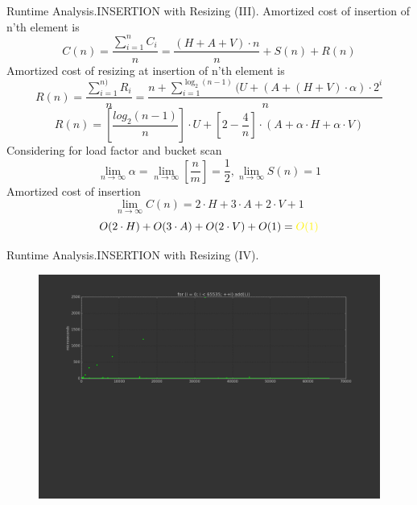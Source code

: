 \documentclass{beamer}
\begin{document}
\begin{frame}{Runtime Analysis.}{INSERTION with Resizing (III).}
  Amortized cost of insertion of n'th element is
  \begin{equation}
    C(n) = \frac{\sum_{i=1}^{n}C_i}{n} = \frac{(H+A+V)\cdot n}{n} + S(n) + R(n)
  \end{equation}
  Amortized cost of resizing at insertion of n'th element is
  \begin{equation}
    R(n) = \frac{\sum_{i=1}^{n)}R_i}{n} = \frac{n + \sum_{i=1}^{\log_2(n-1)}{(U+(A+(H+V)\cdot\alpha)\cdot2^i}}{n} 
  \end{equation}
  \begin{equation}
    R(n) = \left [\frac{log_2(n-1)}{n} \right ]\cdot U + \left [2-\frac{4}{n} \right ]\cdot (A+\alpha\cdot H + \alpha\cdot V) 
  \end{equation}
  Considering for load factor and bucket scan
  \begin{equation}
    \lim_{n \to \infty }\alpha= \lim_{n \to \infty }\left [\frac{n}{m} \right ] = \frac{1}{2},  
    \lim_{n \to \infty }S(n)= 1 
  \end{equation}
  Amortized cost of insertion
  \begin{equation}
    \lim_{n \to \infty }C(n)= 2\cdot H + 3\cdot A + 2\cdot V + 1 
  \end{equation}
  \begin{equation}
    O(2\cdot H)+O(3\cdot A)+O(2\cdot V)+O(1)=\color{yellow}O(1)
  \end{equation}
\end{frame}

\begin{frame}{Runtime Analysis.}{INSERTION with Resizing (IV).}
  \begin{figure}
    \includegraphics[scale=0.3]{insertion_amortized}
  \end{figure}
\end{frame}
\end{document}
